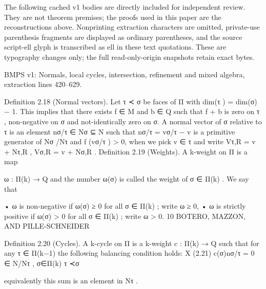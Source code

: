 \documentclass[
  11pt,
]{article}
\newenvironment{Shaded}{}{}
\newcommand{\NormalTok}[1]{#1}
\begin{document}
The following cached v1 bodies are directly included for independent
review. They are not theorem premises; the proofs used in this paper are
the reconstructions above. Nonprinting extraction characters are
omitted, private-use parenthesis fragments are displayed as ordinary
parentheses, and the source script-ell glyph is transcribed as ell in
these text quotations. These are typography changes only; the full
read-only-origin snapshots retain exact bytes.

BMPS v1: Normals, local cycles, intersection, refinement and mixed
algebra, extraction lines 420--629.

\begin{Shaded}
\begin{Highlighting}[]
\NormalTok{Definition 2.18 (Normal vectors). Let τ ≺ σ be faces of Π with dim(τ ) = dim(σ) − 1. This}
\NormalTok{implies that there exists f ∈ M and b ∈ Q such that f + b is zero on τ , non{-}negative on σ and}
\NormalTok{not{-}identically zero on σ. A normal vector of σ relative to τ is an element}
\NormalTok{                                                 nσ/τ ∈ Nσ ⊆ N}
\NormalTok{such that nσ/τ = vσ/τ − v is a primitive generator of Nσ /Nτ and f (vσ/τ ) \textgreater{} 0, when we pick v ∈ τ}
\NormalTok{and write Vτ,R = v + Nτ,R , Vσ,R = v + Nσ,R .}
\NormalTok{Definition 2.19 (Weights). A k{-}weight on Π is a map}

\NormalTok{                                                   ω : Π(k) → Q}
\NormalTok{and the number ω(σ) is called the weight of σ ∈ Π(k) . We say that}

\NormalTok{      • ω is non{-}negative if ω(σ) ≥ 0 for all σ ∈ Π(k) ; write ω ≥ 0,}
\NormalTok{      • ω is strictly positive if ω(σ) \textgreater{} 0 for all σ ∈ Π(k) ; write ω \textgreater{} 0.}
\NormalTok{10                             BOTERO, MAZZON, AND PILLE{-}SCHNEIDER}


\NormalTok{Definition 2.20 (Cycles). A k{-}cycle on Π is a k{-}weight c : Π(k) → Q such that for any τ ∈ Π(k−1)}
\NormalTok{the following balancing condition holds:}
\NormalTok{                                    X}
\NormalTok{(2.21)                                   c(σ)nσ/τ = 0 ∈ N/Nτ ,}
\NormalTok{                                    σ∈Π(k)}
\NormalTok{                                     τ ≺σ}

\NormalTok{equivalently this sum is an element in Nτ .}


\end{Highlighting}
\end{Shaded}
\end{document}
